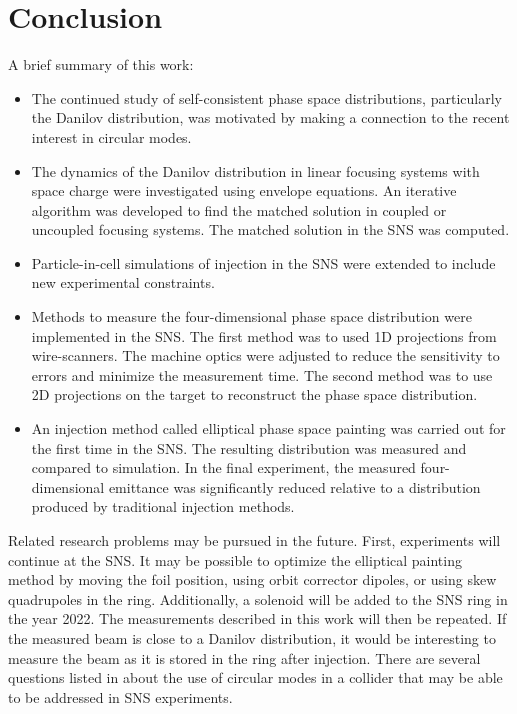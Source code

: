 \chapter{Conclusion} \label{chap-6}

A brief summary of this work:
%
\begin{itemize}
    \item The continued study of self-consistent phase space distributions, particularly the Danilov distribution, was motivated by making a connection to the recent interest in circular modes.
    \item The dynamics of the Danilov distribution in linear focusing systems with space charge were investigated using envelope equations. An iterative algorithm was developed to find the matched solution in coupled or uncoupled focusing systems. The matched solution in the SNS was computed.
    \item Particle-in-cell simulations of injection in the SNS were extended to include new experimental constraints. 
    \item Methods to measure the four-dimensional phase space distribution were implemented in the SNS. The first method was to used 1D projections from wire-scanners. The machine optics were adjusted to reduce the sensitivity to errors and minimize the measurement time. The second method was to use 2D projections on the target to reconstruct the phase space distribution. 
    \item An injection method called elliptical phase space painting was carried out for the first time in the SNS. The resulting distribution was measured and compared to simulation. In the final experiment, the measured four-dimensional emittance was significantly reduced relative to a distribution produced by traditional injection methods.
\end{itemize}
%

Related research problems may be pursued in the future. First, experiments will continue at the SNS. It may be possible to optimize the elliptical painting method by moving the foil position, using orbit corrector dipoles, or using skew quadrupoles in the ring. Additionally, a solenoid will be added to the SNS ring in the year 2022. The measurements described in this work will then be repeated. If the measured beam is close to a Danilov distribution, it would be interesting to measure the beam as it is stored in the ring after injection. There are several questions listed in \cite{Burov2013} about the use of circular modes in a collider that may be able to be addressed in SNS experiments.

